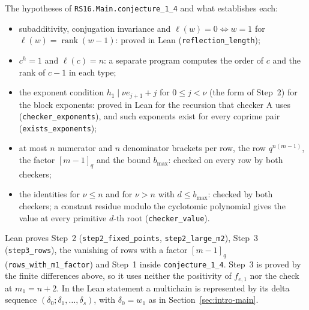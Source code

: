 \documentclass[11pt]{article}
\theoremstyle{definition}
\begin{document}
\begin{appendices}
The hypotheses of \texttt{RS16.Main.conjecture\_1\_4} and what establishes
each:
\begin{itemize}
\item subadditivity, conjugation invariance and $\ell(w)=0\iff w=1$ for
$\ell(w)=\operatorname{rank}(w-1)$: proved in Lean
(\texttt{reflection\_length});
\item $c^h=1$ and $\ell(c)=n$: a separate program computes the order of $c$
and the rank of $c-1$ in each type;
\item the exponent condition $h_1\mid \nu e_{j+1}+j$ for $0\le j<\nu$ (the
form of Step~2) for the block exponents:
proved in Lean for the recursion that checker A uses
(\texttt{checker\_exponents}), and such exponents exist for every coprime
pair (\texttt{exists\_exponents});
\item at most $n$ numerator and $n$ denominator brackets per row, the row
$q^{n(m-1)}$, the factor $[m-1]_q$ and the bound $b_{\max}$: checked on
every row by both checkers;
\item the identities for $\nu\le n$ and for $\nu>n$ with $d\le b_{\max}$:
checked by both checkers; a constant residue modulo the cyclotomic
polynomial gives the value at every primitive $d$-th root
(\texttt{checker\_value}).
\end{itemize}
Lean proves Step~2 (\texttt{step2\_fixed\_points},
\texttt{step2\_large\_m2}), Step~3 (\texttt{step3\_rows}), the vanishing of
rows with a factor $[m-1]_q$ (\texttt{rows\_with\_m1\_factor}) and Step~1
inside \texttt{conjecture\_1\_4}. Step~3 is proved by the finite differences
above, so it uses neither the positivity of $f_{e,1}$
\cite[Theorem~1.6(iv)]{RS} nor the check at $m_1=n+2$. In the Lean statement
a multichain is represented by its delta sequence
$(\delta_0;\delta_1,\dots,\delta_s)$, with $\delta_0=w_1$ as in
Section~\ref{sec:intro-main}.
\end{appendices}
\end{document}
